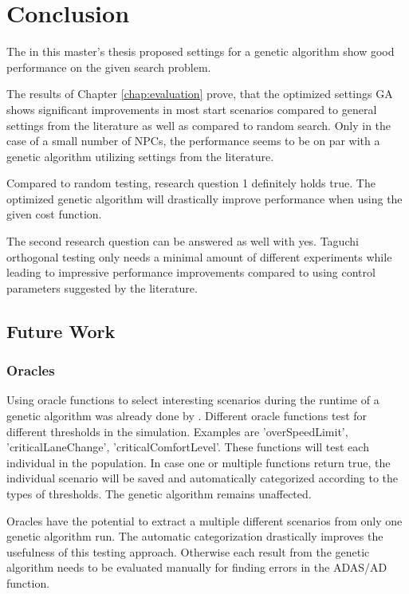 \chapter{Conclusion}
The in this master's thesis proposed settings for a genetic algorithm show good performance on the given search problem.

The results of Chapter \ref{chap:evaluation} prove, that the optimized settings GA shows significant improvements in most start scenarios compared to general settings from the literature as well as compared to random search. Only in the case of a small number of NPCs, the performance seems to be on par with a genetic algorithm utilizing settings from the literature.

Compared to random testing, research question 1 definitely holds true. The optimized genetic algorithm will drastically improve performance when using the given cost function.

The second research question can be answered as well with yes. Taguchi orthogonal testing only needs a minimal amount of different experiments while leading to impressive performance improvements compared to using control parameters suggested by the literature.

\section{Future Work}
\subsection{Oracles}
Using oracle functions to select interesting scenarios during the runtime of a genetic algorithm was already done by \cite{almanee_scenorita_2021}. Different oracle functions test for different thresholds in the simulation. Examples are 'overSpeedLimit', 'criticalLaneChange', 'criticalComfortLevel'. These functions will test each individual in the population. In case one or multiple functions return true, the individual scenario will be saved and automatically categorized according to the types of thresholds. The genetic algorithm remains unaffected.

Oracles have the potential to extract a multiple different scenarios from only one genetic algorithm run. The automatic categorization drastically improves the usefulness of this testing approach. Otherwise each result from the genetic algorithm needs to be evaluated manually for finding errors in the ADAS/AD function.
